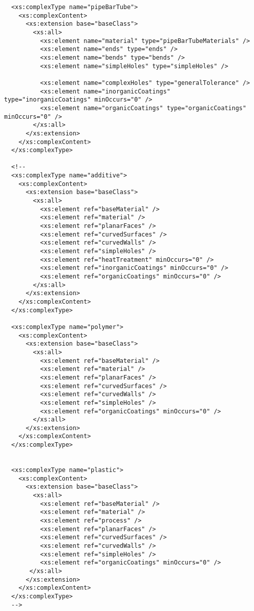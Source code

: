\begin{lstlisting}
  <xs:complexType name="pipeBarTube">
    <xs:complexContent>
      <xs:extension base="baseClass">
        <xs:all>
          <xs:element name="material" type="pipeBarTubeMaterials" />
          <xs:element name="ends" type="ends" />
          <xs:element name="bends" type="bends" />
          <xs:element name="simpleHoles" type="simpleHoles" />

          <xs:element name="complexHoles" type="generalTolerance" />
          <xs:element name="inorganicCoatings" type="inorganicCoatings" minOccurs="0" />
          <xs:element name="organicCoatings" type="organicCoatings" minOccurs="0" />
        </xs:all>
      </xs:extension>
    </xs:complexContent>
  </xs:complexType>

  <!--
  <xs:complexType name="additive">
    <xs:complexContent>
      <xs:extension base="baseClass">
        <xs:all>
          <xs:element ref="baseMaterial" />
          <xs:element ref="material" />
          <xs:element ref="planarFaces" />
          <xs:element ref="curvedSurfaces" />
          <xs:element ref="curvedWalls" />
          <xs:element ref="simpleHoles" />
          <xs:element ref="heatTreatment" minOccurs="0" />
          <xs:element ref="inorganicCoatings" minOccurs="0" />
          <xs:element ref="organicCoatings" minOccurs="0" />
        </xs:all>
      </xs:extension>
    </xs:complexContent>
  </xs:complexType>

  <xs:complexType name="polymer">
    <xs:complexContent>
      <xs:extension base="baseClass">
        <xs:all>
          <xs:element ref="baseMaterial" />
          <xs:element ref="material" />
          <xs:element ref="planarFaces" />
          <xs:element ref="curvedSurfaces" />
          <xs:element ref="curvedWalls" />
          <xs:element ref="simpleHoles" />
          <xs:element ref="organicCoatings" minOccurs="0" />
        </xs:all>
      </xs:extension>
    </xs:complexContent>
  </xs:complexType>


  <xs:complexType name="plastic">
    <xs:complexContent>
      <xs:extension base="baseClass">
        <xs:all>
          <xs:element ref="baseMaterial" />
          <xs:element ref="material" />
          <xs:element ref="process" />
          <xs:element ref="planarFaces" />
          <xs:element ref="curvedSurfaces" />
          <xs:element ref="curvedWalls" />
          <xs:element ref="simpleHoles" />
          <xs:element ref="organicCoatings" minOccurs="0" /> 
       </xs:all>
      </xs:extension>
    </xs:complexContent>
  </xs:complexType>
  -->


\end{lstlisting}
